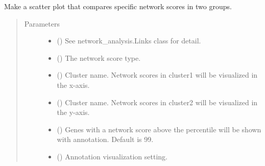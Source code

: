 \documentclass[letterpaper,10pt,english]{sphinxmanual}
\begin{document}
\begin{fulllineitems}
\begin{fulllineitems}
\end{fulllineitems}


\begin{fulllineitems}
\label{\detokenize{modules/celloracle:celloracle.Links.plot_score_comparison_2D}}
Make a scatter plot that compares specific network scores in two groups.
\begin{quote}\begin{description}
\item[{Parameters}] \leavevmode\begin{itemize}
\item {} 
 ({\hyperref[\detokenize{modules/celloracle:celloracle.Links}]{}}) \textendash{} See network\_analysis.Links class for detail.

\item {} 
 () \textendash{} The network score type.

\item {} 
 () \textendash{} Cluster name. Network scores in cluster1 will be visualized in the x-axis.

\item {} 
 () \textendash{} Cluster name. Network scores in cluster2 will be visualized in the y-axis.

\item {} 
 () \textendash{} Genes with a network score above the percentile will be shown with annotation. Default is 99.

\item {} 
 (\sphinxstyleliteralemphasis{\sphinxupquote{(}}\sphinxstyleliteralemphasis{\sphinxupquote{, }}\sphinxstyleliteralemphasis{\sphinxupquote{)}}) \textendash{} Annotation visualization setting.


\end{itemize}
\end{description}
\end{quote}
\end{fulllineitems}
\end{fulllineitems}
\end{document}
